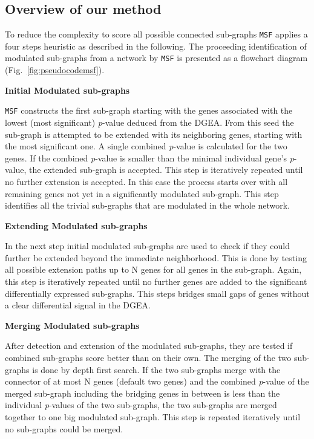 \documentclass[10pt,a4paper,twocolumn]{article}
\begin{document}
\subsection*{Overview of our method}

To reduce the complexity to score all possible connected sub-graphs
\texttt{MSF} applies a four steps heuristic as described in the
following. The proceeding identification of modulated sub-graphs from a
network by \texttt{MSF} is presented as a flowchart diagram
(Fig.~\ref{fig:pseudocodemsf}).



\textbf{Initial Modulated sub-graphs}

\texttt{MSF} constructs the first sub-graph starting with the genes
associated with the lowest (most significant) \textit{p}-value deduced from
the DGEA. From this seed the sub-graph is attempted to be extended with its
neighboring genes, starting with the most significant one. A single
combined \textit{p}-value is calculated for the two genes. If the combined
\textit{p}-value is smaller than the minimal individual gene's
\textit{p}-value, the extended sub-graph is accepted. This step is
iteratively repeated until no further extension is accepted. In this case
the process starts over with all remaining genes not yet in a significantly
modulated sub-graph. This step identifies all the trivial sub-graphs that
are modulated in the whole network.\newline

\textbf{Extending Modulated sub-graphs}

In the next step initial modulated sub-graphs are used to check if they
could further be extended beyond the immediate neighborhood. This is done
by testing all possible extension paths up to N genes for all genes in the
sub-graph. Again, this step is iteratively repeated until no further genes
are added to the significant differentially expressed sub-graphs. This
steps bridges small gaps of genes without a clear differential signal in
the DGEA.\newline

\textbf{Merging Modulated sub-graphs}

After detection and extension of the modulated sub-graphs, they are tested
if combined sub-graphs score better than on their own. The merging of the
two sub-graphs is done by depth first search. If the two sub-graphs merge
with the connector of at most N genes (default two genes) and the combined
\textit{p}-value of the merged sub-graph including the bridging genes in
between is less than the individual \textit{p}-values of the two
sub-graphs, the two sub-graphs are merged together to one big modulated
sub-graph. This step is repeated iteratively until no sub-graphs could be
merged.\newline
\end{document}
